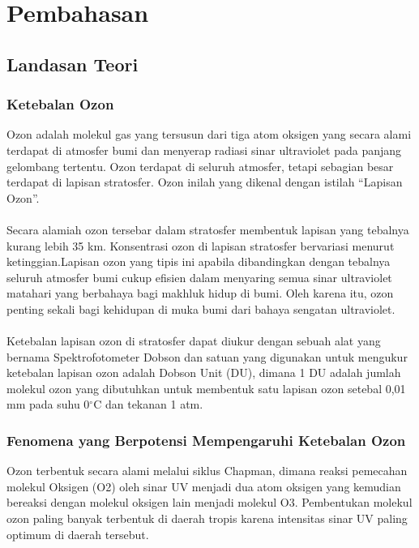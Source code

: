 \chapter{Pembahasan}

\section{Landasan Teori}
\subsection{Ketebalan Ozon}
Ozon adalah molekul gas yang tersusun dari tiga atom oksigen yang secara alami terdapat di atmosfer bumi dan menyerap radiasi sinar ultraviolet pada panjang gelombang tertentu. Ozon terdapat di seluruh atmosfer, tetapi sebagian besar terdapat di lapisan stratosfer. Ozon inilah yang dikenal dengan istilah “Lapisan Ozon”. \\~\\
Secara alamiah ozon tersebar dalam stratosfer
membentuk lapisan yang tebalnya kurang lebih 35 km. Konsentrasi ozon di lapisan stratosfer bervariasi menurut ketinggian.Lapisan ozon yang tipis ini apabila
dibandingkan dengan tebalnya seluruh atmosfer bumi cukup
efisien dalam menyaring semua sinar ultraviolet matahari yang
berbahaya bagi makhluk hidup di bumi. Oleh karena itu, ozon
penting sekali bagi kehidupan di muka bumi dari bahaya
sengatan ultraviolet. \\~\\
Ketebalan lapisan ozon di stratosfer dapat diukur dengan sebuah alat yang bernama Spektrofotometer Dobson dan satuan yang digunakan untuk mengukur ketebalan lapisan ozon adalah Dobson Unit (DU), dimana 1 DU adalah jumlah molekul ozon yang dibutuhkan untuk membentuk satu lapisan ozon setebal 0,01 mm pada suhu 0$^{\circ}$C dan tekanan 1 atm.

\subsection{Fenomena yang Berpotensi Mempengaruhi Ketebalan Ozon}

Ozon terbentuk secara alami melalui siklus Chapman, dimana reaksi pemecahan molekul Oksigen (O2) oleh sinar UV menjadi dua atom oksigen yang kemudian bereaksi dengan molekul oksigen lain menjadi molekul O3. Pembentukan molekul ozon paling banyak terbentuk di daerah tropis karena intensitas sinar UV paling optimum di daerah tersebut.

